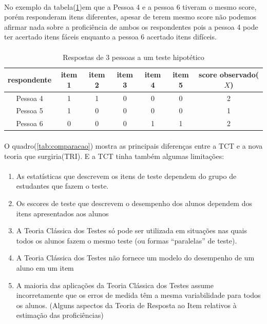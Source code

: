 	\paragraph{}
		No exemplo da tabela(\ref{tab:pessoas2})em que a Pessoa 4 e a pessoa 6 tiveram o mesmo score, porém responderam itens diferentes, apesar de terem mesmo score não podemos afirmar nada sobre a proficiência de ambos os respondentes pois a pessoa 4 pode ter acertado itens fáceis enquanto a pessoa 6 acertado itens difíceis.
    \paragraph{}
	\begin{table}[!h]
	    \centering
	    \begin{tabular}{*{6}{c|}c}
	    \hline
	    respondente & item 1& item 2& item 3 & item 4 & item 5 & score observado($X$)\\
	    \hline
	    \hline
	        Pessoa 4 &  1 & 1 & 0 & 0 & 0 & 2\\
            Pessoa 5 &  1 & 0 & 0 & 0 & 0 & 1\\
            Pessoa 6 &  0 & 0 & 0 & 1 & 1 & 2 \\
            \hline
	    \end{tabular}
	    \caption{Respostas de 3 pessoas a um teste hipotético}
	    \label{tab:pessoas2}
	\end{table}
	\paragraph{}
		O quadro(\ref{tab:comparacao}) mostra as principais diferenças entre a TCT e a nova teoria que surgiria(TRI). E a TCT tinha também algumas limitações:
	\paragraph{}
    	\begin{enumerate}[noitemsep]
    	    \item As estatísticas que descrevem os itens de teste dependem do grupo de estudantes que fazem o teste.\\
            \item Os escores de teste que descrevem o desempenho dos alunos dependem dos itens apresentados aos alunos\\
            \item A Teoria Clássica dos Testes só pode ser utilizada em situações nas quais todos os alunos fazem o mesmo teste (ou formas “paralelas” de teste).\\
            \item A Teoria Clássica dos Testes não fornece um modelo do desempenho de um aluno em um item\\
            \item A maioria das aplicações da Teoria Clássica dos Testes assume incorretamente que os erros de medida têm a mesma variabilidade para todos os alunos. (Alguns aspectos da Teoria de Resposta ao Item relativos à estimação das proficiências)
	    \end{enumerate}

